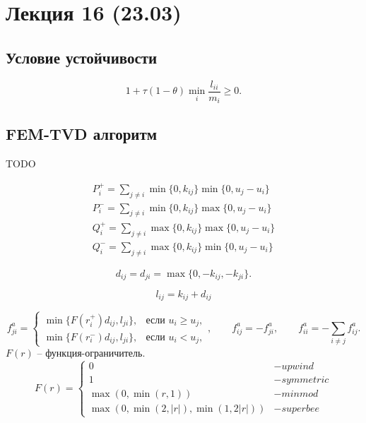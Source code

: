 \section{Лекция 16 (23.03)}

\subsection{Условие устойчивости}
\begin{equation}
\label{eq:femtvd_tau}
1 + \tau(1 - \theta)\min_i\frac{l_{ii}}{m_i} \geq 0.
\end{equation}
\subsection{FEM-TVD алгоритм}
TODO

\begin{equation}
\begin{array}{l}
P_i^{+} = \sum\limits_{j\neq i}\min\{0, k_{ij}\}\min\{0, u_j - u_i\}\\
P_i^{-} = \sum\limits_{j\neq i}\min\{0, k_{ij}\}\max\{0, u_j - u_i\}\\
Q_i^{+} = \sum\limits_{j\neq i}\max\{0, k_{ij}\}\max\{0, u_j - u_i\}\\
Q_i^{-} = \sum\limits_{j\neq i}\max\{0, k_{ij}\}\min\{0, u_j - u_i\}
\end{array}
\end{equation}

\begin{equation}
d_{ij} = d_{ji} = \max\{0, -k_{ij}, -k_{ji}\}.
\end{equation}

\begin{equation}
l_{ij} = k_{ij} + d_{ij}
\end{equation}

\begin{equation}
\label{femtvd_fa}
f_{ji}^a = \begin{cases}
\min\{ F(r_i^+) d_{ij}, l_{ji} \}, &\text{если } u_i \geq u_j,\\
\min\{ F(r_i^-) d_{ij}, l_{ji} \}, &\text{если } u_i < u_j,
\end{cases},
\qquad f^a_{ij} = -f^a_{ji},
\qquad f^a_{ii} = -\sum\limits_{i\neq j} f^a_{ij}.
\end{equation}
$F(r)$ -- функция-ограничитель.
\begin{equation}
F(r) = \left\{
\begin{array}{ll}
0 & - upwind\\
1 & - symmetric \\
\max(0, \min(r, 1)) & - minmod\\
\max(0, \min(2, |r|), \min(1, 2|r|))   & - superbee
\end{array}
\right.
\end{equation}

